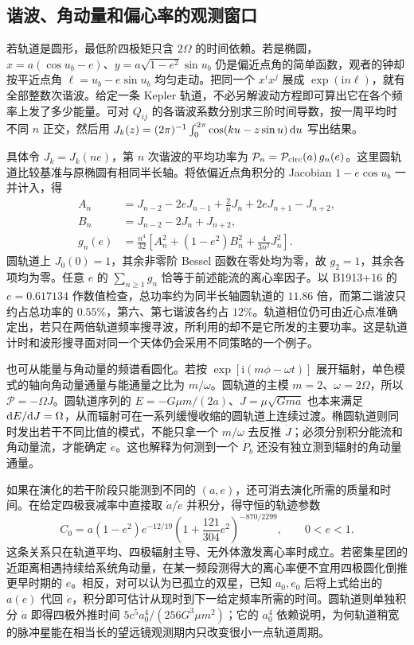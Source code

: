 \subsection{谐波、角动量和偏心率的观测窗口}

若轨道是圆形，最低阶四极矩只含 $2\Omega$ 的时间依赖。若是椭圆，$x=a(\cos u_b-e)$、$y=a\sqrt{1-e^2}\sin u_b$ 仍是偏近点角的简单函数，观者的钟却按平近点角 $\ell=u_b-e\sin u_b$ 均匀走动。把同一个 $x^ix^j$ 展成 $\exp(\mathrm{i}n\ell)$，就有全部整数次谐波。给定一条 Kepler 轨道，不必另解波动方程即可算出它在各个频率上发了多少能量。可对 $Q_{ij}$ 的各谐波系数分别求三阶时间导数，按一周平均时不同 $n$ 正交，然后用 $J_k(z)=(2\pi)^{-1}\int_0^{2\pi}\cos(ku-z\sin u)\,\dd u$ 写出结果。

具体令 $J_k=J_k(ne)$，第 $n$ 次谐波的平均功率为 $\mathcal P_n=\mathcal P_{\rm circ}(a)\,g_n(e)$。这里圆轨道比较基准与原椭圆有相同半长轴。将依偏近点角积分的 Jacobian $1-e\cos u_b$ 一并计入，得
\begin{align*}
 A_n&=J_{n-2}-2eJ_{n-1}+\tfrac2nJ_n+2eJ_{n+1}-J_{n+2},\\
 B_n&=J_{n-2}-2J_n+J_{n+2},\\
 g_n(e)&=\frac{n^4}{32}
 \left[A_n^2+(1-e^2)B_n^2+\frac{4}{3n^2}J_n^2\right].
\end{align*}
圆轨道上 $J_0(0)=1$，其余非零阶 Bessel 函数在零处均为零，故 $g_2=1$，其余各项均为零。任意 $e$ 的 $\sum_{n\ge1}g_n$ 恰等于前述能流的离心率因子。以 B1913+16 的 $e=0.617134$ 作数值检查，总功率约为同半长轴圆轨道的 $11.86$ 倍，而第二谐波只约占总功率的 $0.55\%$，第六、第七谐波各约占 $12\%$。轨道相位仍可由近心点准确定出，若只在两倍轨道频率搜寻波，所利用的却不是它所发的主要功率。这是轨道计时和波形搜寻面对同一个天体仍会采用不同策略的一个例子。

也可从能量与角动量的频谱看圆化。若按 $\exp[\mathrm i(m\phi-\omega t)]$ 展开辐射，单色模式的轴向角动量通量与能通量之比为 $m/\omega$。圆轨道的主模 $m=2$、$\omega=2\Omega$，所以 $\mathcal P=-\Omega\dot J$。圆轨道序列的 $E=-G\mu m/(2a)$、$J=\mu\sqrt{Gma}$ 也本来满足 $\dd E/\dd J=\Omega$，从而辐射可在一系列缓慢收缩的圆轨道上连续过渡。椭圆轨道则同时发出若干不同比值的模式，不能只拿一个 $m/\omega$ 去反推 $\dot J$；必须分别积分能流和角动量流，才能确定 $\dot e$。这也解释为何测到一个 $\dot P_b$ 还没有独立测到辐射的角动量通量。

如果在演化的若干阶段只能测到不同的 $(a,e)$，还可消去演化所需的质量和时间。在给定四极衰减率中直接取 $\dot a/\dot e$ 并积分，得守恒的轨迹参数
\[
 C_0=a(1-e^2)e^{-12/19}
          \left(1+\frac{121}{304}e^2\right)^{-870/2299},
 \qquad 0<e<1 .
\]
这条关系只在轨道平均、四极辐射主导、无外体激发离心率时成立。若密集星团的近距离相遇持续给系统角动量，在某一频段测得大的离心率便不宜用四极圆化倒推更早时期的 $e$。相反，对可以认为已孤立的双星，已知 $a_0,e_0$ 后将上式给出的 $a(e)$ 代回 $\dot e$，积分即可估计从现时到下一给定频率所需的时间。圆轨道则单独积分 $\dot a$ 即得四极外推时间 $5c^5a_0^4/(256G^3\mu m^2)$；它的 $a_0^4$ 依赖说明，为何轨道稍宽的脉冲星能在相当长的望远镜观测期内只改变很小一点轨道周期。

